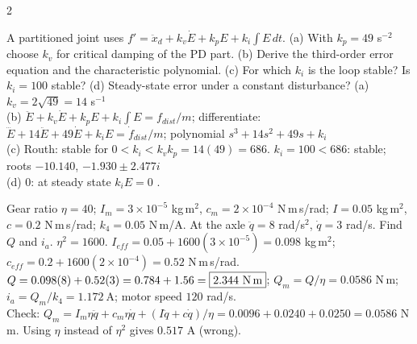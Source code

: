 \begin{multicols}{2}
\begin{examq}
\end{examq}
\begin{examq}
A partitioned joint uses $f'=\ddot x_d+k_v\dot E+k_pE+k_i\!\int\!E\,dt$. (a) With $k_p=49$ s$^{-2}$ choose $k_v$ for critical damping of the PD part. (b) Derive the third-order error equation and the characteristic polynomial. (c) For which $k_i$ is the loop stable? Is $k_i=100$ stable? (d) Steady-state error under a constant disturbance?
\solution
(a) $k_v=2\sqrt{49}=14$ s$^{-1}$ \\
(b) $\ddot E+k_v\dot E+k_pE+k_i\!\int\!E=f_{dist}/m$; differentiate: $\dddot E+14\ddot E+49\dot E+k_iE=\dot f_{dist}/m$; polynomial $s^3+14s^2+49s+k_i$ \\
(c) Routh: stable for $0<k_i<k_vk_p=14(49)=686$. $k_i=100<686$: stable; roots $-10.140$, $-1.930\pm2.477i$ \\
(d) $0$: at steady state $k_iE=0$ . \chk
\end{examq}
\begin{examq}
Gear ratio $\eta=40$; $I_m=3\times10^{-5}$ kg\,m$^2$, $c_m=2\times10^{-4}$ N\,m\,s/rad; $I=0.05$ kg\,m$^2$, $c=0.2$ N\,m\,s/rad; $k_4=0.05$ N\,m/A. At the axle $\ddot q=8$ rad/s$^2$, $\dot q=3$ rad/s. Find $Q$ and $i_a$.
\solution
$\eta^2=1600$. $I_{eff}=0.05+1600(3\times10^{-5})=0.098$ kg\,m$^2$; $c_{eff}=0.2+1600(2\times10^{-4})=0.52$ N\,m\,s/rad.\\
$Q=0.098(8)+0.52(3)=0.784+1.56=\boxed{2.344\ \text{N\,m}}$; $Q_m=Q/\eta=0.0586$ N\,m; $i_a=Q_m/k_4=\boxed{1.172\ \text{A}}$; motor speed $120$ rad/s.\\
Check: $Q_m=I_m\eta\ddot q+c_m\eta\dot q+(I\ddot q+c\dot q)/\eta=0.0096+0.0240+0.0250=0.0586$ N\,m. Using $\eta$ instead of $\eta^2$ gives $0.517$ A (wrong). \chk
\end{examq}
\end{multicols}
